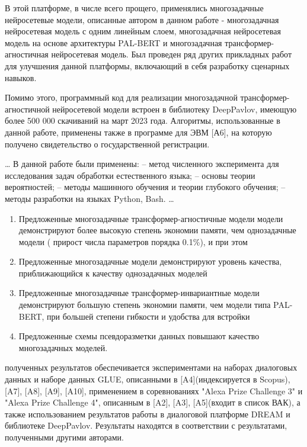 В этой платформе, в числе всего прощего, применялись многозадачные нейросетевые модели, описанные автором в данном работе - многозадачная нейросетевая модель с одним линейным слоем, многозадачная нейросетевая модель на основе архитектуры PAL-BERT и многозадачная трансформер-агностичная нейросетевая модель. Был проведен ряд других прикладных работ для улучшения данной платформы, включающий в себя разработку сценарных навыков.

Помимо этого, программный код для реализации многозадачной трансформер-агностичной нейросетевой модели встроен в библиотеку DeepPavlov, имеющую более 500 000 скачиваний на март 2023 года.
Алгоритмы, использованные в данной работе, применены также в программе для ЭВМ [А6], на которую получено свидетельство о государственной регистрации.


{\methods} \ldots
В данной работе были
применены:
– метод численного эксперимента для исследования задач обработки естественного языка;
– основы теории вероятностей;
– методы машинного обучения и теории глубокого обучения;
– методы разработки на языках Python, Bash.
\ldots

{}
\begin{enumerate}
\item Предложенные многозадачные трансформер-агностичные модели модели демонстрируют более высокую степень экономии памяти, чем однозадачные модели ( прирост числа параметров порядка 0.1\%), и при этом
\item Предложенные многозадачные модели демонстрируют уровень качества, приближающийся к качеству однозадачных моделей
\item Предложенные многозадачные трансформер-инвариантные модели демонстрируют большую степень экономии памяти, чем модели типа PAL-BERT, при большей степени гибкости и удобства для встройки
\item Предложенные схемы псевдоразметки данных повышают качество многозадачных моделей.
\end{enumerate}


{\reliability} полученных результатов обеспечивается экспериментами на наборах диалоговых данных и наборе данных GLUE, описанными в [A4](индексируется в Scopus), [A7], [A8], [A9], [A10], применением в соревнованиях "Alexa Prize Challenge 3" и "Alexa Prize Challenge 4", описанным в [A2], [A3], [A5](входит в список ВАК), а также использованием результатов работы в диалоговой платформе DREAM и библиотеке DeepPavlov. Результаты находятся в соответствии с результатами, полученными другими авторами.


